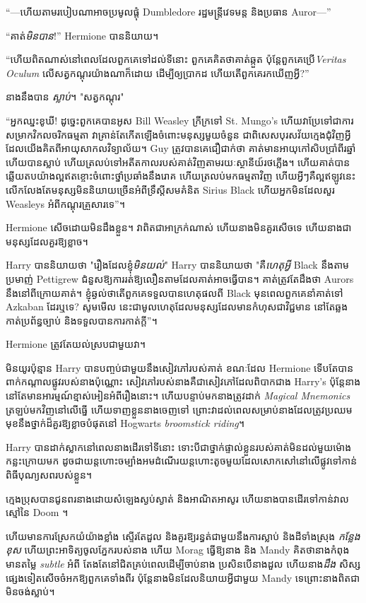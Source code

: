 {“—ហើយតាមរបៀបណាអាចប្រមូលផ្តុំ Dumbledore រដ្ឋមន្ត្រីវេទមន្ត និងប្រធាន Auror—”

“គាត់\emph{មិនបាន}!” Hermione បាននិយាយ។

“ហើយពិតណាស់នៅពេលដែលពួកគេទៅដល់ទីនោះ ពួកគេគិតថាគាត់ឆ្កួត ប៉ុន្តែពួកគេប្រើ\emph{Veritas Oculum} លើសត្វកណ្តុរយ៉ាងណាក៏ដោយ ដើម្បីឲ្យប្រាកដ ហើយតើពួកគេរកឃើញអ្វី?”

នាងនឹងបាន \emph{ស្លាប់}។ "សត្វកណ្តុរ"

“អ្នកឈ្នះខូឃី! ដូច្នេះពួកគេបានអូស Bill Weasley ក្រីក្រទៅ St. Mungo's ហើយវាប្រែទៅជាការសម្រាកវិកលចរិកធម្មតា វាគ្រាន់តែកើតឡើងចំពោះមនុស្សមួយចំនួន ជាពិសេសបុរសវ័យក្មេងជុំវិញអ្វីដែលយើងគិតពីអាយុសាកលវិទ្យាល័យ។ Guy ត្រូវបានគេជឿជាក់ថា គាត់មានអាយុកៅសិបប្រាំពីរឆ្នាំ ហើយបានស្លាប់ ហើយត្រលប់ទៅអតីតកាលរបស់គាត់វិញតាមរយៈស្ថានីយ៍រថភ្លើង។ ហើយគាត់បានឆ្លើយតបយ៉ាងល្អឥតខ្ចោះចំពោះថ្នាំប្រឆាំងនឹងរោគ ហើយត្រលប់មកធម្មតាវិញ ហើយអ្វីៗគឺល្អឥឡូវនេះ លើកលែងតែមនុស្សមិននិយាយច្រើនអំពីទ្រឹស្តីសមគំនិត Sirius Black ហើយអ្នកមិនដែលសួរ Weasleys អំពីកណ្តុរគ្រួសារទេ”។

Hermione សើចដោយមិនដឹងខ្លួន។ វាពិតជាអាក្រក់ណាស់ ហើយនាងមិនគួរសើចទេ ហើយនាងជាមនុស្សដែលគួរឱ្យខ្លាច។

Harry បាននិយាយថា "រឿងដែលខ្ញុំ\emph{មិនយល់}" Harry បាននិយាយថា "គឺ\emph{ហេតុអ្វី} Black នឹងតាមប្រមាញ់ Pettigrew ជំនួសឱ្យការរត់ឱ្យលឿនតាមដែលគាត់អាចធ្វើបាន។ គាត់ត្រូវតែដឹងថា Aurors នឹងនៅពីក្រោយគាត់។ ខ្ញុំឆ្ងល់ថាតើពួកគេទទួលបានហេតុផលពី Black មុនពេលពួកគេនាំគាត់ទៅ Azkaban ដែរឬទេ? សូមមើល នេះជាមូលហេតុដែលមនុស្សដែលមានកំហុសជាវិជ្ជមាន នៅតែឆ្លងកាត់ប្រព័ន្ធច្បាប់ និងទទួលបានការកាត់ក្តី”។

Hermione ត្រូវតែយល់ស្របជាមួយវា។

មិនយូរប៉ុន្មាន Harry បានបញ្ចប់ជាមួយនឹងសៀវភៅរបស់គាត់ ខណៈដែល Hermione ទើបតែបានពាក់កណ្តាលផ្លូវរបស់នាងប៉ុណ្ណោះ សៀវភៅរបស់នាងគឺជាសៀវភៅដែលពិបាកជាង Harry's ប៉ុន្តែនាងនៅតែមានអារម្មណ៍ខ្មាស់អៀនអំពីរឿងនោះ។ ហើយបន្ទាប់មកនាងត្រូវដាក់ \emph{Magical Mnemonics} ត្រឡប់មកវិញនៅលើធ្នើ ហើយទាញខ្លួននាងចេញទៅ ព្រោះវាដល់ពេលសម្រាប់នាងដែលត្រូវប្រឈមមុខនឹងថ្នាក់ដ៏គួរឱ្យខ្លាចបំផុតនៅ Hogwarts \emph{broomstick riding}។

Harry បានដាក់ស្លាកនៅពេលនាងដើរទៅទីនោះ ទោះបីជាថ្នាក់ផ្ទាល់ខ្លួនរបស់គាត់មិនដល់មួយម៉ោងកន្លះក្រោយមក ដូចជាយន្តហោះចម្បាំងអមដំណើរយន្តហោះតូចមួយដែលសោកសៅនៅលើផ្លូវទៅកាន់ពិធីបុណ្យសពរបស់ខ្លួន។

ក្មេងប្រុសបានជូនពរនាងដោយសំឡេងស្ងប់ស្ងាត់ និងអាណិតអាសូរ ហើយនាងបានដើរទៅកាន់វាលស្មៅនៃ Doom ។

ហើយមានការស្រែកយំយ៉ាងខ្លាំង ស្ទើរតែដួល និងគួរឱ្យរន្ធត់ជាមួយនឹងការស្លាប់ និងដីទាំងស្រុង \emph{កន្លែងខុស} ហើយព្រះអាទិត្យចូលភ្នែករបស់នាង ហើយ Morag ធ្វើឱ្យនាង និង Mandy គិតថានាងកំពុងមានតម្លៃ \emph{subtle} អំពី តែងតែនៅជិតគ្រប់ពេលដើម្បីចាប់នាង ប្រសិនបើនាងដួល ហើយនាង\emph{ដឹង} សិស្សផ្សេងទៀតសើចចំអកឱ្យពួកគេទាំងពីរ ប៉ុន្តែនាងមិនដែលនិយាយអ្វីជាមួយ Mandy ទេព្រោះនាងពិតជាមិនចង់ស្លាប់។

}
